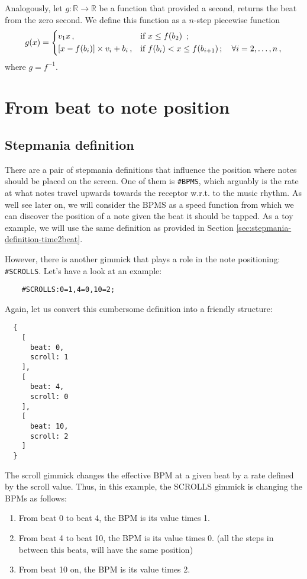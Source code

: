 \documentclass[a4paper,9pt]{article}
\begin{document}
    Analogously, let $ g: \mathbb{R} \rightarrow \mathbb{R} $ be a function that provided a second, returns the beat from the zero second. We define this function as a $n$-step piecewise function
    \begin{equation}
	    g(x) = \begin{dcases}
		    v_1x\,, & \text{if $x \leq f(b_{2}) $ }\,;\\
		    \left[x-f(b_{i})\right]\times v_i + b_{i}\,, & \text{if $f(b_{i}) < x \leq f(b_{i+1})\,;\quad \forall i=2,\ldots,n$}\,, \\
	    \end{dcases}
	    \label{eq:beat2second}
    \end{equation}
    where $g = f^{-1}$.

    \section{From beat to note position}

    \subsection{Stepmania definition}

    There are a pair of stepmania definitions that influence the position where notes should be placed on the screen. One of them is \texttt{\#BPMS}, which arguably is the rate at what notes travel upwards towards the receptor w.r.t. to the music rhythm. As well see later on, we will consider the BPMS as a speed function from which we can discover the position of a note given the beat it should be tapped. As a toy example, we will use the same definition as provided in Section \ref{sec:stepmania-definition-time2beat}. 

    However, there is another gimmick that plays a role in the note positioning: \texttt{\#SCROLLS}. Let's have a look at an example:

    \begin{verbatim}
    #SCROLLS:0=1,4=0,10=2;     
    \end{verbatim}
    Again, let us convert this cumbersome definition into a friendly structure:
    \begin{verbatim}
  {
    [
      beat: 0,
      scroll: 1
    ],
    [
      beat: 4,
      scroll: 0 
    ],
    [
      beat: 10,
      scroll: 2 
    ]
  }
    \end{verbatim}
    The scroll gimmick changes the effective BPM at a given beat by a rate defined by the scroll value. Thus, in this example, the SCROLLS gimmick is changing the BPMs as follows:
    \begin{enumerate}
		\item From beat 0 to beat 4, the BPM is its value times 1.
		\item From beat 4 to beat 10, the BPM is its value times 0. (all the steps in between this beats, will have the same position)
		\item From beat 10 on, the BPM is its value times 2.
    \end{enumerate}
\end{document}

